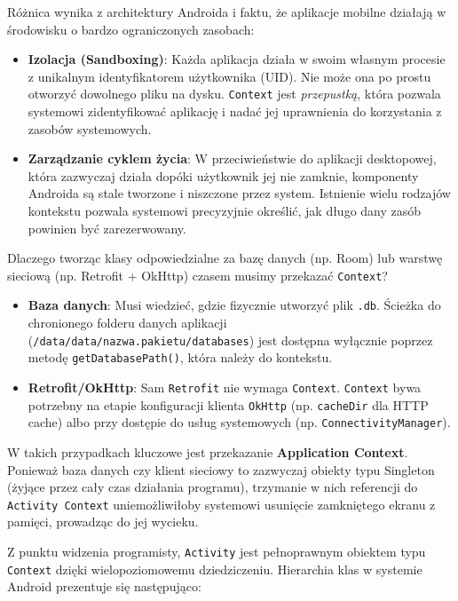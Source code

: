 Różnica wynika z architektury Androida i faktu, że aplikacje mobilne działają w środowisku o bardzo ograniczonych zasobach:
\begin{itemize}
    \item \textbf{Izolacja (Sandboxing)}: Każda aplikacja działa w swoim własnym procesie z unikalnym identyfikatorem użytkownika (UID). Nie może ona po prostu otworzyć dowolnego pliku na dysku. \texttt{Context} jest \textit{przepustką}, która pozwala systemowi zidentyfikować aplikację i nadać jej uprawnienia do korzystania z zasobów systemowych.
    \item \textbf{Zarządzanie cyklem życia}: W przeciwieństwie do aplikacji desktopowej, która zazwyczaj działa dopóki użytkownik jej nie zamknie, komponenty Androida są stale tworzone i niszczone przez system. Istnienie wielu rodzajów kontekstu pozwala systemowi precyzyjnie określić, jak długo dany zasób powinien być zarezerwowany.
\end{itemize}

Dlaczego tworząc klasy odpowiedzialne za bazę danych (np. Room) lub warstwę sieciową (np. Retrofit + OkHttp) czasem musimy przekazać \texttt{Context}?
\begin{itemize}
    \item \textbf{Baza danych}: Musi wiedzieć, gdzie fizycznie utworzyć plik \texttt{.db}. Ścieżka do chronionego folderu danych aplikacji (\texttt{/data/data/nazwa.pakietu/databases}) jest dostępna wyłącznie poprzez metodę \texttt{getDatabasePath()}, która należy do kontekstu.
    \item \textbf{Retrofit/OkHttp}: Sam \texttt{Retrofit} nie wymaga \texttt{Context}. \texttt{Context} bywa potrzebny na etapie konfiguracji klienta \texttt{OkHttp} (np. \texttt{cacheDir} dla HTTP cache) albo przy dostępie do usług systemowych (np. \texttt{ConnectivityManager}).
\end{itemize}

W takich przypadkach kluczowe jest przekazanie \textbf{Application Context}. Ponieważ baza danych czy klient sieciowy to zazwyczaj obiekty typu Singleton (żyjące przez cały czas działania programu), trzymanie w nich referencji do \texttt{Activity Context} uniemożliwiłoby systemowi usunięcie zamkniętego ekranu z pamięci, prowadząc do jej wycieku.

Z punktu widzenia programisty, \texttt{Activity} jest pełnoprawnym obiektem typu \texttt{Context} dzięki wielopoziomowemu dziedziczeniu. Hierarchia klas w systemie Android prezentuje się następująco:


